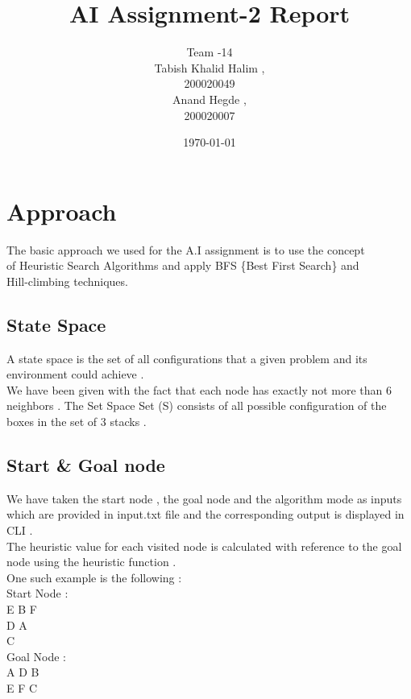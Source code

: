 \documentclass{article}
\title{AI Assignment-2 Report}
\date{\today}
\author{Team -14 \\Tabish Khalid Halim , \\ 200020049 \\ Anand Hegde , \\ 200020007}
\affil{Department of Computer Science, IIT Dharwad}
\begin{document}
\maketitle
{}
\newpage
\tableofcontents

\newpage
{}
\section{Approach}
The basic approach we used for the A.I assignment is to use the concept \\of Heuristic Search Algorithms and 
apply BFS \{Best First Search\} and \\Hill-climbing techniques.
\vspace{10pt}
\subsection*{State Space}
A state space is the set of all configurations that a given problem and its \\environment could achieve .
\vspace{10pt}
\\We have been given with the fact that each node has exactly not more than 6 neighbors .
The Set Space Set (S) consists of all possible configuration of the
boxes in the set of 3 stacks .
\subsection*{Start \& Goal node}
We have taken the start node , the goal node and the algorithm mode as inputs which are provided in input.txt file 
and the corresponding output is displayed in CLI .
\vspace{10pt}
\\The heuristic value for each visited node is calculated with reference to the goal node using the heuristic function .
\vspace{10pt}
\\One such example is the following :
\\Start Node :
\\\hspace*{10pt}E B F
\\\hspace*{10pt}D A 
\\\hspace*{10pt}C
\\Goal Node :
\\\hspace*{10pt}A D B
\\\hspace*{10pt}E F C
\newpage
\end{document}
